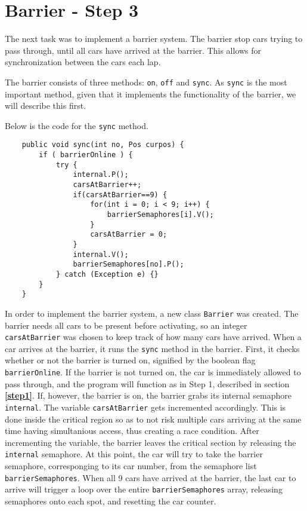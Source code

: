 \section{Barrier - Step 3}
The next task was to implement a barrier system. The barrier stop cars trying to pass through, until all cars have arrived at the barrier. This allows for synchronization between the cars each lap. 

The barrier consists of three methods: \texttt{on}, \texttt{off} and \texttt{sync}. As \texttt{sync} is the most important method, given that it implements the functionality of the barrier, we will describe this first.

Below is the code for the \texttt{sync} method.
\begin{lstlisting}
    public void sync(int no, Pos curpos) {
        if ( barrierOnline ) {
            try {
                internal.P();
                carsAtBarrier++;
                if(carsAtBarrier==9) {
                    for(int i = 0; i < 9; i++) {
                        barrierSemaphores[i].V();
                    }
                    carsAtBarrier = 0;
                }
                internal.V();
                barrierSemaphores[no].P();
            } catch (Exception e) {}
        }
    }
\end{lstlisting}

In order to implement the barrier system, a new class \texttt{Barrier} was created. The barrier needs all cars to be present before activating, so an integer \texttt{carsAtBarrier} was chosen to keep track of how many cars have arrived. When a car arrives at the barrier, it runs the \texttt{sync} method in the barrier. First, it checks whether or not the barrier is turned on, signified by the boolean flag \texttt{barrierOnline}. If the barrier is not turned on, the car is immediately allowed to pass through, and the program will function as in Step 1, described in section \textbf{\ref{step1}}. If, however, the barrier is on, the barrier grabs its internal semaphore \texttt{internal}. The variable \texttt{carsAtBarrier} gets incremented accordingly. This is done inside the critical region so as to not risk multiple cars arriving at the same time having simultanious access, thus creating a race condition. After incrementing the variable, the barrier leaves the critical section by releasing the \texttt{internal} semaphore. At this point, the car will try to take the barrier semaphore, corresponging to its car number, from the semaphore list \texttt{barrierSemaphores}. When all 9 cars have arrived at the barrier, the last car to arrive will trigger a loop over the entire \texttt{barrierSemaphores} array, releasing semaphores onto each spot, and resetting the car counter. 

